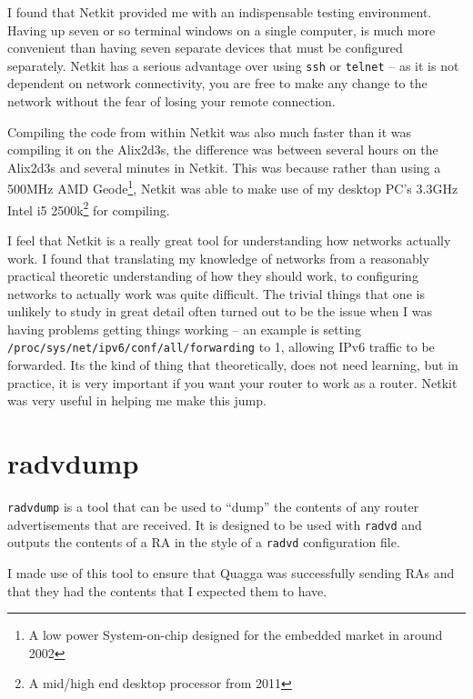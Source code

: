 \documentclass[12pt]{report}
\begin{document}
I found that Netkit provided me with an indispensable testing environment.
Having up seven or so terminal windows on a single computer, is much more
convenient than having seven separate devices that must be configured
separately. Netkit has a serious advantage over using \texttt{ssh} or
\texttt{telnet} -- as it is not dependent on network connectivity, you are free
to make any change to the network without the fear of losing your remote
connection.   

Compiling the code from within Netkit was also much faster than it was
compiling it on the Alix2d3s, the difference was between several hours on the
Alix2d3s and several minutes in Netkit. This was because rather than using a
500MHz AMD Geode\footnote{A low power System-on-chip designed for the embedded market
in around 2002}, Netkit was able to make use of my desktop PC's 3.3GHz 
Intel i5 2500k\footnote{A mid/high end desktop processor from 2011} for
compiling. 

I feel that Netkit is a really great tool for understanding how networks
actually work. I found that translating my knowledge of networks from a
reasonably practical theoretic understanding of how they should work, to
configuring networks to actually work was quite difficult. The trivial things
that one is unlikely to study in great detail often turned out to be the issue
when I was having problems getting things working -- an example is setting
\texttt{/proc/sys/net/ipv6/conf/all/forwarding} to 1, allowing IPv6 traffic to
be forwarded. Its the kind of thing that theoretically,  does not need learning,
but in practice, it is very important if you want your router to work as a
router. Netkit was very useful in helping me make this jump. 


\section{radvdump}
\texttt{radvdump} is a tool that can be used to ``dump'' the contents of any
router advertisements that are received. It is designed to be used with
\texttt{radvd} and outputs the contents of a RA in the style of a
\texttt{radvd} configuration file. 

I made use of this tool to ensure that Quagga was successfully sending RAs and
that they had the contents that I expected them to have. 
\end{document}
